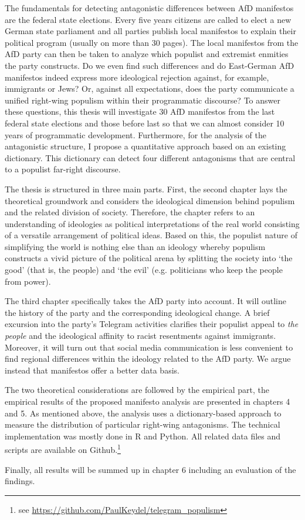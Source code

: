 \documentclass[a4paper]{scrreprt}
\begin{document}
The fundamentals for detecting antagonistic differences between AfD manifestos are the federal state elections. Every five years citizens are called to elect a new German state parliament and all parties publish local manifestos to explain their political program (usually on more than 30 pages). The local manifestos from the AfD party can then be taken to analyze which populist and extremist enmities the party constructs. Do we even find such differences and do East-German AfD manifestos indeed express more ideological rejection against, for example, immigrants or Jews? Or, against all expectations, does the party communicate a unified right-wing populism within their programmatic discourse? To answer these questions, this thesis will investigate 30 AfD manifestos from the last federal state elections and those before last so that we can almost consider 10 years of programmatic development. Furthermore, for the analysis of the antagonistic structure, I propose a quantitative approach based on an existing dictionary. This dictionary can detect four different antagonisms that are central to a populist far-right discourse.\par
The thesis is structured in three main parts. First, the second chapter lays the theoretical groundwork and considers the ideological dimension behind populism and the related division of society. Therefore, the chapter refers to an understanding of ideologies as political interpretations of the real world consisting of a versatile arrangement of political ideas. Based on this, the populist nature of simplifying the world is nothing else than an ideology whereby populism constructs a vivid picture of the political arena by splitting the society into `the good' (that is, the people) and `the evil' (e.g. politicians who keep the people from power).\par
The third chapter specifically takes the AfD party into account. It will outline the history of the party and the corresponding ideological change. A brief excursion into the party's Telegram activities clarifies their populist appeal to {\em the people} and the ideological affinity to racist resentments against immigrants. Moreover, it will turn out that social media communication is less convenient to find regional differences within the ideology related to the AfD party. We argue instead that manifestos offer a better data basis.\par
The two theoretical considerations are followed by the empirical part, the empirical results of the proposed manifesto analysis are presented in chapters 4 and 5. As mentioned above, the analysis uses a dictionary-based approach to measure the distribution of particular right-wing antagonisms. The technical implementation was mostly done in R and Python. All related data files and scripts are available on Github.\footnote{see \url{https://github.com/PaulKeydel/telegram_populism}}\par
Finally, all results will be summed up in chapter 6 including an evaluation of the findings.
\end{document}
